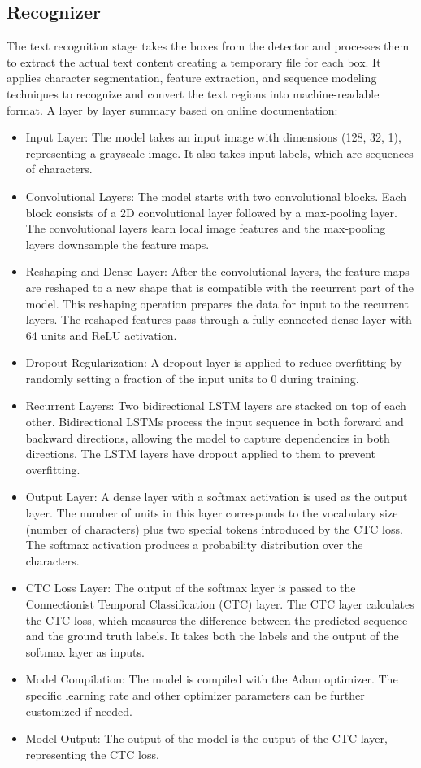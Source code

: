 \subsection{Recognizer}
The text recognition stage takes the boxes from the detector and processes them to extract the actual text content creating a temporary file for each box. It applies character segmentation, feature extraction, and sequence modeling techniques to recognize and convert the text regions into machine-readable format. A layer by layer summary based on online documentation:
\begin{itemize}
    \item Input Layer: The model takes an input image with dimensions (128, 32, 1), representing a grayscale image. It also takes input labels, which are sequences of characters.
    \item Convolutional Layers: The model starts with two convolutional blocks. Each block consists of a 2D convolutional layer followed by a max-pooling layer. The convolutional layers learn local image features and the max-pooling layers downsample the feature maps.
    \item Reshaping and Dense Layer: After the convolutional layers, the feature maps are reshaped to a new shape that is compatible with the recurrent part of the model. This reshaping operation prepares the data for input to the recurrent layers. The reshaped features pass through a fully connected dense layer with 64 units and ReLU activation.
    \item Dropout Regularization: A dropout layer is applied to reduce overfitting by randomly setting a fraction of the input units to 0 during training.
    \item Recurrent Layers: Two bidirectional LSTM layers are stacked on top of each other. Bidirectional LSTMs process the input sequence in both forward and backward directions, allowing the model to capture dependencies in both directions. The LSTM layers have dropout applied to them to prevent overfitting.
    \item Output Layer: A dense layer with a softmax activation is used as the output layer. The number of units in this layer corresponds to the vocabulary size (number of characters) plus two special tokens introduced by the CTC loss. The softmax activation produces a probability distribution over the characters.
    \item CTC Loss Layer: The output of the softmax layer is passed to the Connectionist Temporal Classification (CTC) layer. The CTC layer calculates the CTC loss, which measures the difference between the predicted sequence and the ground truth labels. It takes both the labels and the output of the softmax layer as inputs.
    \item Model Compilation: The model is compiled with the Adam optimizer. The specific learning rate and other optimizer parameters can be further customized if needed.
    \item Model Output: The output of the model is the output of the CTC layer, representing the CTC loss. 

\end{itemize}


